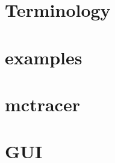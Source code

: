 \documentclass{article}
\begin{document}
\section{Terminology} 
\section{examples} 
\section{mctracer} 
\section{GUI} 
\end{document}
